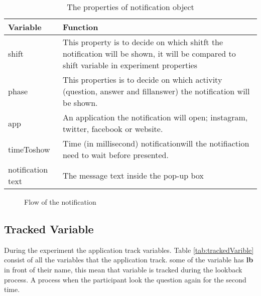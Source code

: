 \begin{table}[!b]
\centering
\small
\footnotesize
\begin{tabu}{|X[2,l]|X[5,l]|}
\hline
Variable          & Function                                                                                                                                  \\ \hline
shift             & This property is to decide on which shitft the notification will be shown, it will be compared to shift variable in experiment properties \\ \hline
phase             & This properties is to decide on which activity (question, answer and fillanswer) the notification will be shown.                          \\ \hline
app               & An application the notification will open; instagram, twitter, facebook or website.                           \\ \hline
timeToshow        & Time (in millisecond) notificationwill the notifiaction need to wait before presented.                                                           \\ \hline
notification text & The message text inside the pop-up box                                                                                     \\ \hline
\end{tabu}
\caption{The properties of notification object}
\label{NotifactionProperties}

\end{table}


\begin{figure}[!b]
\begin{center}
\end{center}
\centering
\captionsetup{justification=centering}
\caption{Flow of the notification}
\label{fig:clicked_notification_flow}
\end{figure}



\subsection{Tracked Variable}
During the experiment the application track variables. Table \ref{tab:trackedVarible} consist of all the variables that the application track.
some of the variable has \textbf{lb} in front of their name, this mean that variable is tracked during the lookback process.
A process when the participant look the question again for the second time.

